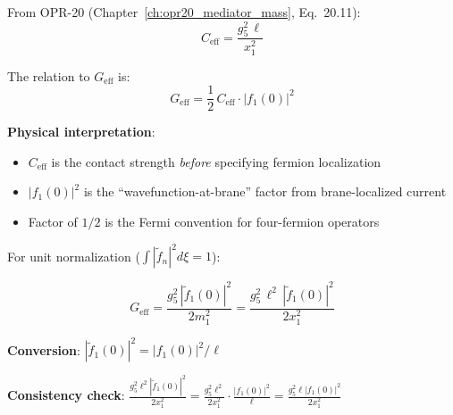 \begin{tcolorbox}[colback=orange!5!white, colframe=orange!50!black,
    title=\textbf{Key Result: Connection to OPR-20 $C_{\text{eff}}$}]

From OPR-20 (Chapter~\ref{ch:opr20_mediator_mass}, Eq.~20.11):
\begin{equation}
    C_{\text{eff}} = \frac{g_5^2 \, \ell}{x_1^2}
\end{equation}

The relation to $G_{\text{eff}}$ is:
\begin{equation}
    \boxed{G_{\text{eff}} = \frac{1}{2} \, C_{\text{eff}} \cdot |f_1(0)|^2}
    \label{eq:ch19_geff_ceff}
\end{equation}

\textbf{Physical interpretation}:
\begin{itemize}
    \item $C_{\text{eff}}$ is the contact strength \emph{before} specifying fermion localization
    \item $|f_1(0)|^2$ is the ``wavefunction-at-brane'' factor from brane-localized current
    \item Factor of $1/2$ is the Fermi convention for four-fermion operators
\end{itemize}

\end{tcolorbox}

\begin{tcolorbox}[colback=orange!5!white, colframe=orange!50!black,
    title=\textbf{Key Result: $G_{\text{eff}}$ in Unit Normalization}]

For unit normalization ($\int |\tilde{f}_n|^2 d\xi = 1$):

\begin{equation}
    \boxed{G_{\text{eff}} = \frac{g_5^2 \, |\tilde{f}_1(0)|^2}{2 m_1^2}
    = \frac{g_5^2 \, \ell^2 \, |\tilde{f}_1(0)|^2}{2 x_1^2}}
    \label{eq:ch19_geff_unit}
\end{equation}

\textbf{Conversion}: $|\tilde{f}_1(0)|^2 = |f_1(0)|^2 / \ell$

\textbf{Consistency check}:
$\frac{g_5^2 \ell^2 |\tilde{f}_1(0)|^2}{2 x_1^2}
= \frac{g_5^2 \ell^2}{2 x_1^2} \cdot \frac{|f_1(0)|^2}{\ell}
= \frac{g_5^2 \ell |f_1(0)|^2}{2 x_1^2}$ \checkmark

\end{tcolorbox}


